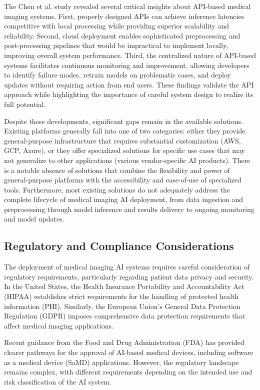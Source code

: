 \documentclass[12pt,a4paper]{article}
\begin{document}
The Chen et al. study revealed several critical insights about API-based medical imaging systems. First, properly designed APIs can achieve inference latencies competitive with local processing while providing superior scalability and reliability. Second, cloud deployment enables sophisticated preprocessing and post-processing pipelines that would be impractical to implement locally, improving overall system performance. Third, the centralized nature of API-based systems facilitates continuous monitoring and improvement, allowing developers to identify failure modes, retrain models on problematic cases, and deploy updates without requiring action from end users. These findings validate the API approach while highlighting the importance of careful system design to realize its full potential.

Despite these developments, significant gaps remain in the available solutions. Existing platforms generally fall into one of two categories: either they provide general-purpose infrastructure that requires substantial customization (AWS, GCP, Azure), or they offer specialized solutions for specific use cases that may not generalize to other applications (various vendor-specific AI products). There is a notable absence of solutions that combine the flexibility and power of general-purpose platforms with the accessibility and ease-of-use of specialized tools. Furthermore, most existing solutions do not adequately address the complete lifecycle of medical imaging AI deployment, from data ingestion and preprocessing through model inference and results delivery to ongoing monitoring and model updates.

\subsection{Regulatory and Compliance Considerations}

The deployment of medical imaging AI systems requires careful consideration of regulatory requirements, particularly regarding patient data privacy and security. In the United States, the Health Insurance Portability and Accountability Act (HIPAA) establishes strict requirements for the handling of protected health information (PHI). Similarly, the European Union's General Data Protection Regulation (GDPR) imposes comprehensive data protection requirements that affect medical imaging applications.

Recent guidance from the Food and Drug Administration (FDA) \cite{fda2021ai} has provided clearer pathways for the approval of AI-based medical devices, including software as a medical device (SaMD) applications. However, the regulatory landscape remains complex, with different requirements depending on the intended use and risk classification of the AI system.
\end{document}
